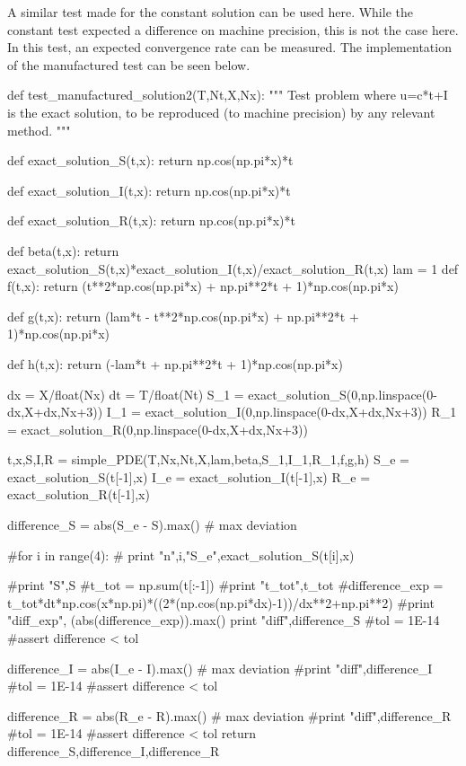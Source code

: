 \documentclass[%
twoside,                 %
final,                   %
chapterprefix=true,      %
open=right               %
10pt]{book}
\begin{document}
A similar test made for the constant solution can be used here. While the constant test expected a difference on machine precision, this is not the case here. In this test, an expected convergence rate can be measured. The implementation of the manufactured test can be seen below.

\bpycod
def test_manufactured_solution2(T,Nt,X,Nx):
    """
    Test problem where u=c*t+I is the exact solution, to be
    reproduced (to machine precision) by any relevant method.
    """
    
    def exact_solution_S(t,x):
        return np.cos(np.pi*x)*t

    def exact_solution_I(t,x):
        return np.cos(np.pi*x)*t

    def exact_solution_R(t,x):
        return np.cos(np.pi*x)*t


    def beta(t,x):
        return exact_solution_S(t,x)*exact_solution_I(t,x)/exact_solution_R(t,x)
    lam = 1
    def f(t,x):
        return (t**2*np.cos(np.pi*x) + np.pi**2*t + 1)*np.cos(np.pi*x) 

    def g(t,x):
        return (lam*t - t**2*np.cos(np.pi*x) + np.pi**2*t + 1)*np.cos(np.pi*x)

    def h(t,x):
        return (-lam*t + np.pi**2*t + 1)*np.cos(np.pi*x)
        

    dx = X/float(Nx)
    dt = T/float(Nt)
    S_1 = exact_solution_S(0,np.linspace(0-dx,X+dx,Nx+3))
    I_1 = exact_solution_I(0,np.linspace(0-dx,X+dx,Nx+3))
    R_1 = exact_solution_R(0,np.linspace(0-dx,X+dx,Nx+3))
     
    t,x,S,I,R = simple_PDE(T,Nx,Nt,X,lam,beta,S_1,I_1,R_1,f,g,h)
    S_e = exact_solution_S(t[-1],x)
    I_e = exact_solution_I(t[-1],x)
    R_e = exact_solution_R(t[-1],x)
    
    difference_S = abs(S_e - S).max()  # max deviation

    
    #for i in range(4):
    #    print "n",i,"S_e",exact_solution_S(t[i],x)
    
    #print "S",S
    #t_tot = np.sum(t[:-1])
    #print "t_tot",t_tot
    #difference_exp = t_tot*dt*np.cos(x*np.pi)*((2*(np.cos(np.pi*dx)-1))/dx**2+np.pi**2)
    #print "diff_exp", (abs(difference_exp)).max()
    print "diff",difference_S
    #tol = 1E-14
    #assert difference < tol
    
    difference_I = abs(I_e - I).max()  # max deviation
    #print "diff",difference_I
    #tol = 1E-14
    #assert difference < tol
   
    difference_R = abs(R_e - R).max()  # max deviation
    #print "diff",difference_R
    #tol = 1E-14
    #assert difference < tol
    return difference_S,difference_I,difference_R
\epycod
\end{document}
